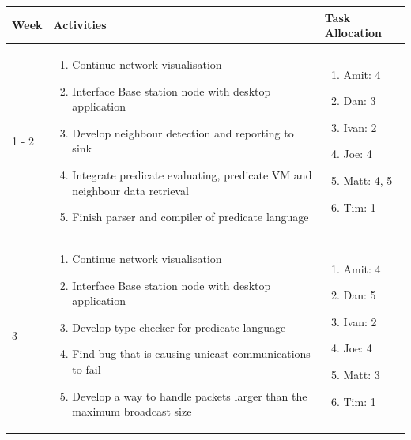 \begin{center}
	\begin{longtable}{| l | p{7.5cm} | p{5cm} |}
	\hline
	Week & Activities & Task Allocation\\
	\hline
	1 - 2 & \begin{enumerate}
		\item Continue network visualisation
		\item Interface Base station node with desktop application
		\item Develop neighbour detection and reporting to sink
		\item Integrate predicate evaluating, predicate VM and neighbour data retrieval
		\item Finish parser and compiler of predicate language
		\end{enumerate} &
	\begin{enumerate}
		\item[] Amit: 4
		\item[] Dan: 3
		\item[] Ivan: 2
		\item[] Joe: 4
		\item[] Matt: 4, 5
		\item[] Tim: 1
	\end{enumerate}
	\\ \hline

	3 & \begin{enumerate}
		\item Continue network visualisation
		\item Interface Base station node with desktop application
		\item Develop type checker for predicate language
		\item Find bug that is causing unicast communications to fail
		\item Develop a way to handle packets larger than the maximum broadcast size
		\end{enumerate} &
	\begin{enumerate}
		\item[] Amit: 4
		\item[] Dan: 5
		\item[] Ivan: 2
		\item[] Joe: 4
		\item[] Matt: 3
		\item[] Tim: 1
	\end{enumerate}
	\\ \hline


\end{longtable}
\end{center}
